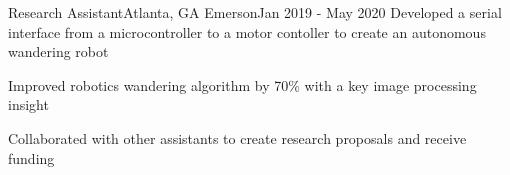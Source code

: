\resumeSubheading
{Research Assistant}{Atlanta, GA}
{Emerson}{Jan 2019 - May 2020}
\resumeItemListStart
\resumeItem
{
    Developed a serial interface from a microcontroller to a motor contoller
    to create an autonomous wandering robot
}

\resumeItem
{
    Improved robotics wandering algorithm by 70\% with a key image processing insight
}

\resumeItem
{
    Collaborated with other assistants to create research proposals and receive funding
}
\resumeItemListEnd
